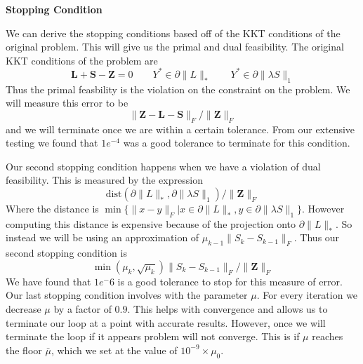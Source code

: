 \documentclass[12pt]{article}
\newcommand{\vL}{{\mathbf{L}}}
\newcommand{\vS}{{\mathbf{S}}}
\newcommand{\vZ}{{\mathbf{Z}}}
\newcommand{\dist}{\mathrm{dist}}    %
\begin{document}
\noindent \textbf{Stopping Condition}

\noindent We can derive the stopping conditions based off of the KKT conditions of the original problem. This will give us the primal and dual feasibility. The original KKT conditions of the problem are
$$\vL + \vS - \vZ = 0 \qquad Y^* \in \partial \|L\|_* \qquad Y^* \in \partial\|\lambda S\|_1$$
Thus the primal feasbility is the violation on the constraint on the problem. We will measure this error to be 
$$\|\vZ - \vL - \vS\|_F / \|\vZ\|_F$$
and we will terminate once we are within a certain tolerance. From our extensive testing we found that $1e^{-4}$ was a good tolerance to terminate for this condition.


\noindent Our second stopping condition happens when we have a violation of dual feasibility. This is measured by the expression
$$\dist (\partial \|L\|_*, \partial\|\lambda S\|_1) / \|\vZ\|_F$$
Where the distance is $\min \{\|x - y\|_F | x \in \partial \|L\|_*, y \in \partial\|\lambda S\|_1\}$.
However computing this distance is expensive because of the projection onto $\partial \|L\|_*$. So instead we will be using an approximation of $\mu_{k-1}\|S_k - S_{k-1}\|_F$. Thus our second stopping condition is 
$$\min(\mu_k, \sqrt{\mu_k}) \|S_k - S_{k-1}\|_F / \|\vZ\|_F$$
We have found that $1e^-6$ is a good tolerance to stop for this measure of error.\\

\noindent Our last stopping condition involves with the parameter $\mu$. For every iteration we decrease $\mu$ by a factor of $0.9$. This helps with convergence and allows us to terminate our loop at a point with accurate results. However, once we will terminate the loop if it appears problem will not converge. This is if $\mu$ reaches the floor $\bar{\mu}$, which we set at the value of $10^{-9} \times \mu_0$.
\newpage
\end{document}

